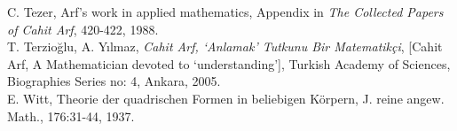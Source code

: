 \documentclass[12pt]{amsart}
\begin{document}
\begin{thebibliography}{10}
 C. Tezer, Arf's work in applied mathematics,
Appendix in {\it The Collected Papers of Cahit Arf}, 420-422, 1988. \\

 T. Terzio\u{g}lu, A. Y{\i}lmaz, {\it Cahit Arf, `Anlamak' Tutkunu Bir Matematik\c{c}i}, [Cahit Arf, A Mathematician devoted to `understanding'], Turkish Academy of Sciences, Biographies Series no: 4, Ankara, 2005. \\

 E. Witt, Theorie der quadrischen Formen in beliebigen K\"{o}rpern, J. reine angew. Math., 176:31-44, 1937. \\

\end{thebibliography}

\begin{center}
 \\
 
\end{center}
\end{document}
